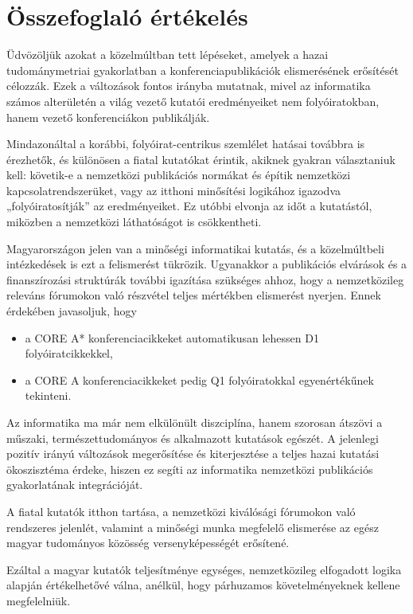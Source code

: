 \documentclass[12pt,a4paper]{article}
\begin{document}
\section{Összefoglaló értékelés}
Üdvözöljük azokat a közelmúltban tett lépéseket, amelyek a hazai tudománymetriai gyakorlatban a konferenciapublikációk elismerésének erősítését célozzák. Ezek a változások fontos irányba mutatnak, mivel az informatika számos alterületén a világ vezető kutatói eredményeiket nem folyóiratokban, hanem vezető konferenciákon publikálják. 

Mindazonáltal a korábbi, folyóirat-centrikus szemlélet hatásai továbbra is érezhetők, és különösen a fiatal kutatókat érintik, akiknek gyakran választaniuk kell: követik-e a nemzetközi publikációs normákat és építik nemzetközi kapcsolatrendszerüket, vagy az itthoni minősítési logikához igazodva „folyóiratosítják” az eredményeiket. Ez utóbbi elvonja az időt a kutatástól, miközben a nemzetközi láthatóságot is csökkentheti.

Magyarországon jelen van a minőségi informatikai kutatás, és a közelmúltbeli intézkedések is ezt a felismerést tükrözik. Ugyanakkor a publikációs elvárások és a finanszírozási struktúrák további igazítása szükséges ahhoz, hogy a nemzetközileg releváns fórumokon való részvétel teljes mértékben elismerést nyerjen. Ennek érdekében javasoljuk, hogy 
\begin{itemize}
  \item a CORE A\!* konferenciacikkeket automatikusan lehessen D1 folyóiratcikkekkel,
  \item a CORE A konferenciacikkeket pedig Q1 folyóiratokkal egyenértékűnek tekinteni.
\end{itemize}

Az informatika ma már nem elkülönült diszciplína, hanem szorosan átszövi a műszaki, természettudományos és alkalmazott kutatások egészét. A jelenlegi pozitív irányú változások megerősítése és kiterjesztése a teljes hazai kutatási ökoszisztéma érdeke, hiszen ez segíti az informatika nemzetközi publikációs gyakorlatának integrációját.

A fiatal kutatók itthon tartása, a nemzetközi kiválósági fórumokon való rendszeres jelenlét, valamint a minőségi munka megfelelő elismerése az egész magyar tudományos közösség versenyképességét erősítené. 

Ezáltal a magyar kutatók teljesítménye egységes, nemzetközileg elfogadott logika alapján értékelhetővé válna, anélkül, hogy párhuzamos követelményeknek kellene megfelelniük.

%
%

\end{document}
